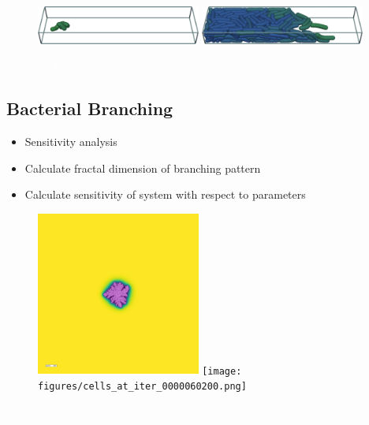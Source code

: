 \documentclass{article}
\newcommand{\todo}[1]{\colorbox{WildStrawberry}{\textcolor{white}{#1}}}
\begin{document}
\begin{figure}[H]
    \centering
    \includegraphics[width=0.48\textwidth]{figures/bacterial-rods-0000000025.png}%
    \hspace{0.04\textwidth}%
    \includegraphics[width=0.48\textwidth]{figures/bacterial-rods-0000007200.png}%
    \caption{\todo{caption}}
    \label{fig:bacterial-rods-sim}
\end{figure}

\subsection{Bacterial Branching}
\label{subsection:bacterial-branching}
\begin{itemize}
    \item Sensitivity analysis
    \item Calculate fractal dimension of branching pattern
    \item Calculate sensitivity of system with respect to parameters
\end{itemize}

\begin{figure}[H]
    \centering
    \includegraphics[width=0.48\textwidth]{figures/cells_at_iter_0000009800.png}%
    \hspace{0.04\textwidth}%
    \texttt{[image: figures/cells\_at\_iter\_0000060200.png]}%
    \caption{\todo{caption}}
    \label{fig:bacterial-branching-sim}
\end{figure}
\end{document}
